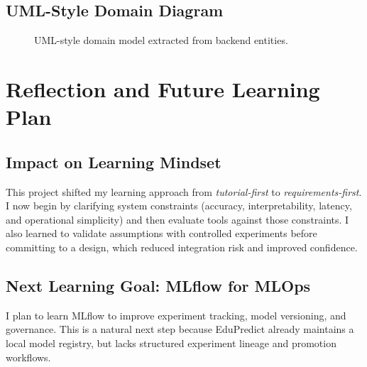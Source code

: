\documentclass[12pt]{article}
\begin{document}
\subsection{UML-Style Domain Diagram}
\begin{figure}[H]
\centering
{}
\caption{UML-style domain model extracted from backend entities.}
\end{figure}

\section{Reflection and Future Learning Plan}
\subsection{Impact on Learning Mindset}
This project shifted my learning approach from \textit{tutorial-first} to \textit{requirements-first}. I now begin by clarifying system constraints (accuracy, interpretability, latency, and operational simplicity) and then evaluate tools against those constraints. I also learned to validate assumptions with controlled experiments before committing to a design, which reduced integration risk and improved confidence.

\subsection{Next Learning Goal: MLflow for MLOps}
I plan to learn MLflow to improve experiment tracking, model versioning, and governance. This is a natural next step because EduPredict already maintains a local model registry, but lacks structured experiment lineage and promotion workflows.
\end{document}
